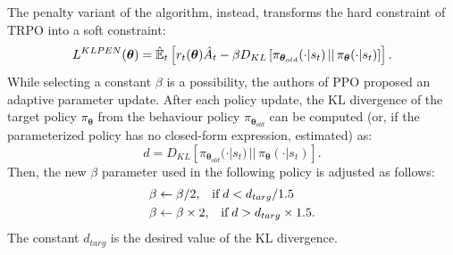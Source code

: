 The penalty variant of the algorithm, instead, transforms the hard constraint of \ac{TRPO} into a soft constraint:
%
\begin{equation*}
    L^{KLPEN}(\boldsymbol{\theta}) = \hat{\operatorname*{\mathbb{E}}}_t \left[ r_t(\boldsymbol{\theta}) \hat{A}_t - \beta D_{KL}\left[\pi_{\boldsymbol{\theta}_{old}}(\cdot|s_t) \,||\, \pi_{\boldsymbol{\theta}}(\cdot|s_t)\right] \right] .
\end{equation*}
%
While selecting a constant $\beta$ is a possibility, the authors of \ac{PPO} proposed an adaptive parameter update.
After each policy update, the \ac{KL} divergence of the target policy $\pi_{\boldsymbol{\theta}}$ from the behaviour policy $\pi_{\boldsymbol{\theta}_{old}}$ can be computed (or, if the parameterized policy has no closed-form expression, estimated) as:
%
\begin{equation*}
    d = D_{KL}\left[\pi_{\boldsymbol{\theta}_{old}}(\cdot|s_t) \, || \, \pi_{\boldsymbol{\theta}}(\cdot|s_t)\right]
    .
\end{equation*}
%
Then, the new $\beta$ parameter used in the following policy is adjusted as follows:
%
\begin{align*}
    &\beta \leftarrow \beta / 2 \text{,\quad if\;} d < d_{targ} / 1.5 \\
    &\beta \leftarrow \beta \times 2 \text{,\quad if\;} d > d_{targ} \times 1.5 .
\end{align*}
%
The constant $d_{targ}$ is the desired value of the \ac{KL} divergence.
